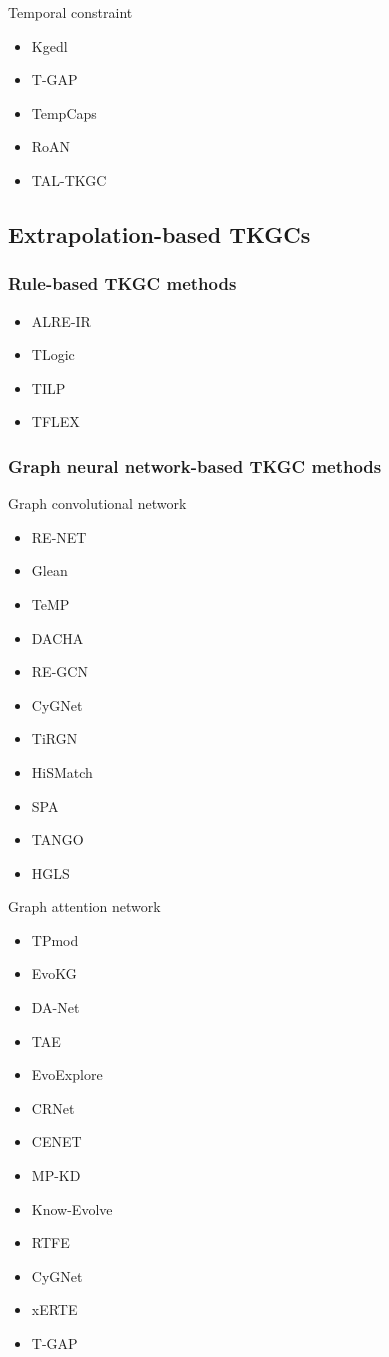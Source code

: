 \documentclass[12pt]{article}
\begin{document}
Temporal constraint
\begin{itemize}
    \item Kgedl
    \item T-GAP
    \item TempCaps
    \item RoAN
    \item TAL-TKGC
\end{itemize}

\subsection{Extrapolation-based TKGCs}

\subsubsection{Rule-based TKGC methods}

\begin{itemize}
    \item ALRE-IR
    \item TLogic
    \item TILP
    \item TFLEX
\end{itemize}

\subsubsection{Graph neural network-based TKGC methods}

Graph convolutional network
\begin{itemize}
    \item RE-NET
    \item Glean
    \item TeMP
    \item DACHA
    \item RE-GCN
    \item CyGNet
    \item TiRGN
    \item HiSMatch
    \item SPA
    \item TANGO
    \item HGLS
\end{itemize}

Graph attention network
\begin{itemize}
    \item TPmod
    \item EvoKG
    \item DA-Net
    \item TAE
    \item EvoExplore
    \item CRNet
    \item CENET
    \item MP-KD
    \item Know-Evolve
    \item RTFE
    \item CyGNet
    \item xERTE
    \item T-GAP
\end{itemize}
\end{document}
